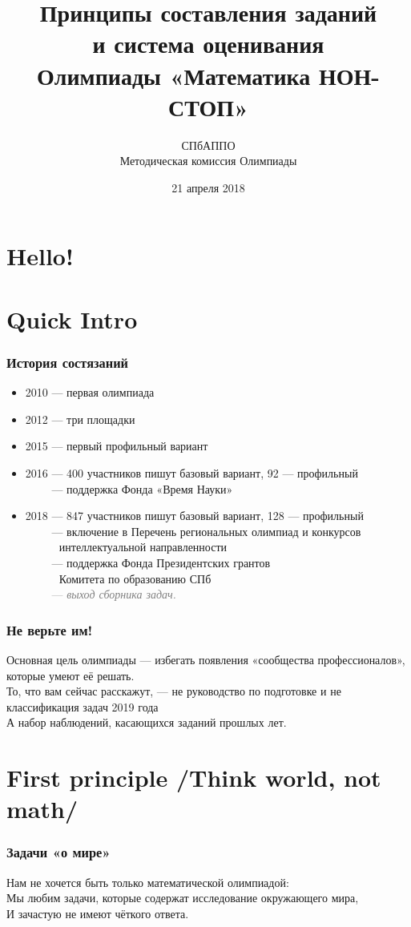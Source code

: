 \documentclass[aspectratio=1610,12pt]{beamer}
\title[Математика НОН-СТОП $\mid$ Семинар]
	{\bfseries Принципы составления заданий \\
		и система оценивания \\
		Олимпиады «Математика НОН-СТОП»}
\author[Б.А.\,Золотов, Д.Г.\,Штукенберг]
	{СПбАППО \\ \vspace{0.3cm} Методическая комиссия Олимпиады}
\institute[\textcolor{white}{«Время науки», ЛНМО, СПбАППО}]{}
\date{21 апреля 2018}
\def\fram#1#2{\begin{frame}\frametitle{\bf #1}#2\end{frame}}
\def\scolon{\rlap{,}\raisebox{0.8ex}{,} }
\def\mitem{\medskip\item}
\def\ps{\\ [0.8cm]}
\def\mitem{\medskip\item}
\begin{document}
\section[Приветствие]{Hello!}
\begin{frame}\titlepage\end{frame}

\section[Введение]{Quick Intro}

\fram{История состязаний}{
\begin{itemize}
	\item 2010 — первая олимпиада\scolon
	\mitem 2012 — три площадки\scolon
	\mitem 2015 — первый профильный вариант\scolon
	\mitem 2016 — 400 участников пишут базовый вариант, 92 --- профильный\scolon\\
        $\phantom{2016}$ — поддержка Фонда «Время Науки»\scolon
	\mitem 2018 — 847 участников пишут базовый вариант, 128 --- профильный\scolon\\
        $\phantom{2018}$ — включение в Перечень региональных олимпиад и конкурсов\\
	$\phantom{2018 — }$\quad интеллектуальной направленности \scolon\\
	$\phantom{2018}$ — поддержка Фонда Президентских грантов\\
	$\phantom{2018 — }$\quad Комитета по образованию СПб\scolon\\
	$\phantom{2018}$ \textcolor{gray}{— {\itshape выход сборника задач.}}
\end{itemize}}

\fram{Не верьте им!}{
	Основная цель олимпиады — избегать появления «сообщества профессионалов», которые умеют её решать. \ps
	То, что вам сейчас расскажут, — не руководство по подготовке и не классификация задач 2019 года\scolon \ps
	А набор наблюдений, касающихся заданий прошлых лет.
}

\section[1]{First principle /Think world, not math/}
\fram{Задачи «о мире»}{
	Нам не хочется быть только математической олимпиадой: \ps
	Мы любим задачи, которые содержат исследование окружающего мира, \ps
	И зачастую не имеют чёткого ответа.
}
\end{document}
